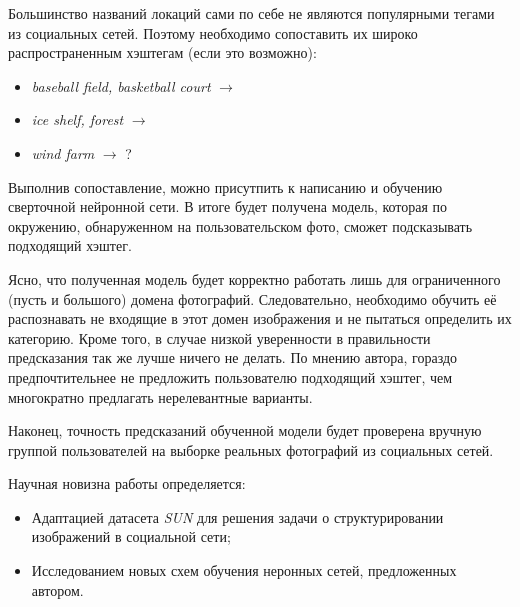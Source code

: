   Большинство названий локаций сами по себе не являются популярными 
  тегами из социальных сетей. Поэтому необходимо
  сопоставить их широко распространенным хэштегам (если это возможно):
  
  \begin{itemize}
      \item \textit{baseball field, basketball court}  $\rightarrow$ 
      \item \textit{ice shelf, forest} $\rightarrow$ 
      \item \textit{wind farm} $\rightarrow$ ?
  \end{itemize}
  
  Выполнив сопоставление, можно присутпить к написанию
  и обучению сверточной нейронной сети. В итоге будет получена
  модель, которая по окружению, обнаруженном на пользовательском фото,
  сможет подсказывать подходящий хэштег.
  
  Ясно, что полученная модель будет корректно работать лишь для
  ограниченного (пусть и большого) домена фотографий. Следовательно, необходимо 
  обучить её распознавать не входящие в этот домен изображения и
   не пытаться определить их категорию. Кроме того, в случае низкой уверенности
   в правильности предсказания так же лучше ничего не делать. 
    По мнению автора, гораздо предпочтительнее не 
   предложить пользователю подходящий хэштег, чем многократно предлагать 
   нерелевантные варианты.
   
Наконец, точность предсказаний обученной модели будет проверена 
вручную группой пользователей на выборке реальных фотографий из 
социальных сетей.
   
Научная новизна работы определяется:
\begin{itemize}
    \item Адаптацией датасета \textit{SUN} для решения задачи о структурировании
    изображений в социальной сети;
    \item Исследованием новых схем обучения неронных сетей, предложенных автором. 
\end{itemize}






